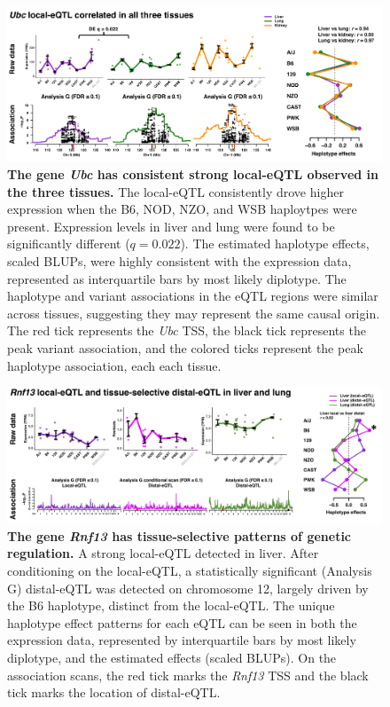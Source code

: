\documentclass[10pt,letterpaper,twoside]{article}
\begin{document}
\begin{figure}[hp]
\renewcommand{\familydefault}{\sfdefault}\normalfont
\centering
\includegraphics[width=\textwidth, trim={0in 0in 0in 0in}, clip]{figs/ubc_correlated_eqtl.png}
\caption{\textbf{The gene \textit{Ubc} has consistent strong local-eQTL observed in the three tissues.} 
The local-eQTL consistently drove higher expression when the B6, NOD, NZO, and WSB haploytpes were present. Expression levels in liver and lung were found to be significantly different ($q = 0.022$). The estimated haplotype effects, scaled BLUPs, were highly consistent with the expression data, represented as interquartile bars by most likely diplotype. The haplotype and variant associations in the eQTL regions were similar across tissues, suggesting they may represent the same causal origin. The red tick represents the \textit{Ubc} TSS, the black tick represents the peak variant association, and the colored ticks represent the peak haplotype association, each each tissue.
\label{fig:ubc_correlated_eqtl}}
\end{figure}

\begin{figure}[hp]
\renewcommand{\familydefault}{\sfdefault}\normalfont
\centering
\includegraphics[width=\textwidth, trim={0in 0in 0in 0in}, clip]{figs/rnf13_distal_eqtl.png}
\caption{\textbf{The gene \textit{Rnf13} has tissue-selective patterns of genetic regulation.} 
A strong local-eQTL detected in liver. After conditioning on the local-eQTL, a statistically significant (Analysis G) distal-eQTL was detected on chromosome 12, largely driven by the B6 haplotype, distinct from the local-eQTL. The unique haplotype effect patterns for each eQTL can be seen in both the expression data, represented by interquartile bars by most likely diplotype, and the estimated effects (scaled BLUPs). On the association scans, the red tick marks the \textit{Rnf13} TSS and the black tick marks the location of distal-eQTL.
\label{fig:rnf13_distal_eqtl}}
\end{figure}
\end{document}
